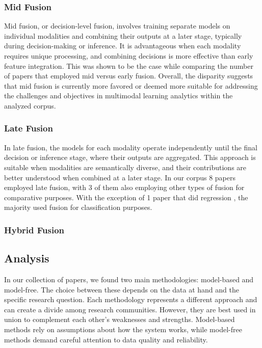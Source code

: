 \documentclass[manuscript,screen,review]{acmart}
\begin{document}
\subsubsection{Mid Fusion}

Mid fusion, or decision-level fusion, involves training separate models on individual modalities and combining their outputs at a later stage, typically during decision-making or inference. It is advantageous when each modality requires unique processing, and combining decisions is more effective than early feature integration. This was shown to be the case while comparing the number of papers that employed mid versus early fusion. Overall, the disparity suggests that mid fusion is currently more favored or deemed more suitable for addressing the challenges and objectives in multimodal learning analytics within the analyzed corpus. 

\subsubsection{Late Fusion}

In late fusion, the models for each modality operate independently until the final decision or inference stage, where their outputs are aggregated. This approach is suitable when modalities are semantically diverse, and their contributions are better understood when combined at a later stage. In our corpus 8 papers employed late fusion, with 3 of them also employing other types of fusion for comparative purposes\cite{1315379489,2936220551,4277812050}. With the exception of 1 paper that did regression \cite{2836996318}, the majority used fusion for classification purposes.
 
\subsubsection{Hybrid Fusion}


\subsection{Analysis}\label{subsec:findings_analysis}

In our collection of papers, we found two main methodologies: model-based and model-free. The choice between these depends on the data at hand and the specific research question. Each methodology represents a different approach and can create a divide among research communities. However, they are best used in union to complement each other's weaknesses and strengths. Model-based methods rely on assumptions about how the system works, while model-free methods demand careful attention to data quality and reliability.
\end{document}

